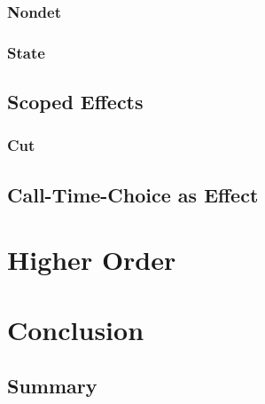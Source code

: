 \documentclass[10pt,a4paper,twoside]{report}
\begin{document}
\subsection{Nondet}
\subsection{State}

\section{Scoped Effects}
\subsection{Cut}

\section{Call-Time-Choice as Effect}
\chapter{Higher Order}

\chapter{Conclusion}
\section{Summary}

\printbibliography
\end{document}
